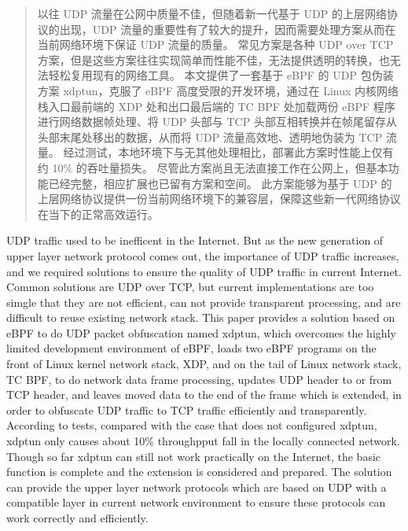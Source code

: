 


\begin{abstract}
  以往 UDP 流量在公网中质量不佳，但随着新一代基于 UDP 的上层网络协议的出现，UDP 流量的重要性有了较大的提升，因而需要处理方案从而在当前网络环境下保证 UDP 流量的质量。
  常见方案是各种 UDP over TCP 方案，但是这些方案往往实现简单而性能不佳，无法提供透明的转换，也无法轻松复用现有的网络工具。
  本文提供了一套基于 eBPF 的 UDP 包伪装方案 xdptun，克服了 eBPF 高度受限的开发环境，通过在 Linux 内核网络栈入口最前端的 XDP 处和出口最后端的 TC BPF 处加载两份 eBPF 程序进行网络数据帧处理、将 UDP 头部与 TCP 头部互相转换并在帧尾留存从头部末尾处移出的数据，从而将 UDP 流量高效地、透明地伪装为 TCP 流量。
  经过测试，本地环境下与无其他处理相比，部署此方案时性能上仅有约 10\% 的吞吐量损失。
  尽管此方案尚且无法直接工作在公网上，但基本功能已经完整，相应扩展也已留有方案和空间。
  此方案能够为基于 UDP 的上层网络协议提供一份当前网络环境下的兼容层，保障这些新一代网络协议在当下的正常高效运行。
\end{abstract}

\begin{abstract*}
  UDP traffic used to be inefficent in the Internet. But as the new generation of upper layer network protocol comes out, the importance of UDP traffic increases, and we required solutions to ensure the quality of UDP traffic in current Internet.
  Common solutions are UDP over TCP, but current implementations are too simgle that they are not efficient, can not provide transparent processing, and are difficult to reuse existing network stack.
  This paper provides a solution based on eBPF to do UDP packet obfuscation named xdptun, which overcomes the highly limited development environment of eBPF, loads two eBPF programs on the front of Linux kernel network stack, XDP, and on the tail of Linux network stack, TC BPF, to do network data frame processing, updates UDP header to or from TCP header, and leaves moved data to the end of the frame which is extended, in order to obfuscate UDP traffic to TCP traffic efficiently and transparently.
  According to tests, compared with the case that does not configured xdptun, xdptun only causes about 10\% throughpput fall in the locally connected network.
  Though so far xdptun can still not work practically on the Internet, the basic function is complete and the extension is considered and prepared.
  The solution can provide the upper layer network protocols which are based on UDP with a compatible layer in current network environment to ensure these protocols can work correctly and efficiently.
\end{abstract*}
